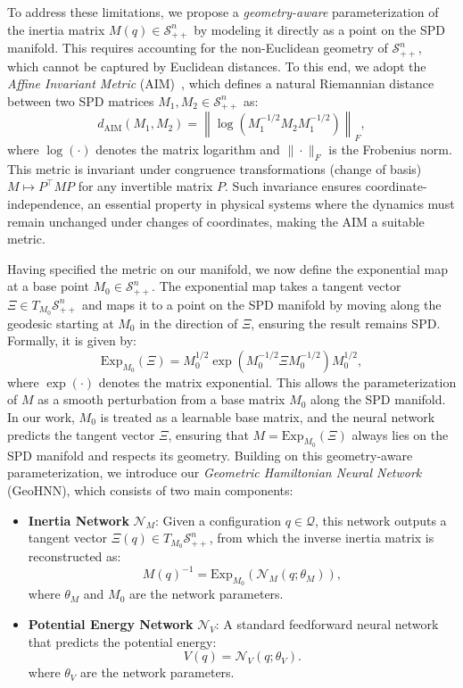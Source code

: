 \documentclass{article}
\theoremstyle{plain}
\theoremstyle{definition}
\theoremstyle{remark}
\begin{document}
To address these limitations, we propose a \emph{geometry-aware} parameterization of the inertia matrix $M(q) \in \mathcal{S}_{++}^n$ by modeling it directly as a point on the SPD manifold. This requires accounting for the non-Euclidean geometry of $\mathcal{S}_{++}^n$, which cannot be captured by Euclidean distances. To this end, we adopt the \emph{Affine Invariant Metric} (AIM)~\citep{spd_manifold_metric}, which defines a natural Riemannian distance between two SPD matrices $M_1, M_2 \in \mathcal{S}_{++}^n$ as:
\[
    d_{\mathrm{AIM}}(M_1, M_2) = \left\| \log\left(M_1^{-1/2} M_2 M_1^{-1/2}\right) \right\|_F,
\]
where $\log(\cdot)$ denotes the matrix logarithm and $\|\cdot\|_F$ is the Frobenius norm. This metric is invariant under congruence transformations (change of basis) $M \mapsto P^\top M P$ for any invertible matrix $P$. Such invariance ensures coordinate-independence, an essential property in physical systems where the dynamics must remain unchanged under changes of coordinates, making the AIM a suitable metric.

Having specified the metric on our manifold, we now define the exponential map at a base point $M_0 \in \mathcal{S}_{++}^n$. The exponential map takes a tangent vector $\Xi \in T_{M_0} \mathcal{S}_{++}^n$ and maps it to a point on the SPD manifold by moving along the geodesic starting at $M_0$ in the direction of $\Xi$, ensuring the result remains SPD. Formally, it is given by:
\[
    \mathrm{Exp}_{M_0}(\Xi) = M_0^{1/2} \exp\left( M_0^{-1/2} \Xi M_0^{-1/2} \right) M_0^{1/2},
\]
where $\exp(\cdot)$ denotes the matrix exponential. This allows the parameterization of $M$ as a smooth perturbation from a base matrix $M_0$ along the SPD manifold. In our work, $M_0$ is treated as a learnable base matrix, and the neural network predicts the tangent vector $\Xi$, ensuring that $M = \mathrm{Exp}_{M_0}(\Xi)$ always lies on the SPD manifold and respects its geometry. Building on this geometry-aware parameterization, we introduce our \emph{Geometric Hamiltonian Neural Network} (GeoHNN), which consists of two main components:
\begin{itemize}
    \item \textbf{Inertia Network} $\mathcal{N}_M$: Given a configuration $q \in \mathcal{Q}$, this network outputs a tangent vector $\Xi(q) \in T_{M_0} \mathcal{S}_{++}^n$, from which the inverse inertia matrix is reconstructed as:
    \[
        M(q)^{-1} = \mathrm{Exp}_{M_0} \left( \mathcal{N}_M(q; \theta_M) \right),
    \]
    where $\theta_M$ and $M_0$ are the network parameters.

    \item \textbf{Potential Energy Network} $\mathcal{N}_V$: A standard feedforward neural network that predicts the potential energy:
    \[
        V(q) = \mathcal{N}_V(q; \theta_V).
    \]
    where $\theta_V$ are the network parameters.

\end{itemize}
\end{document}
